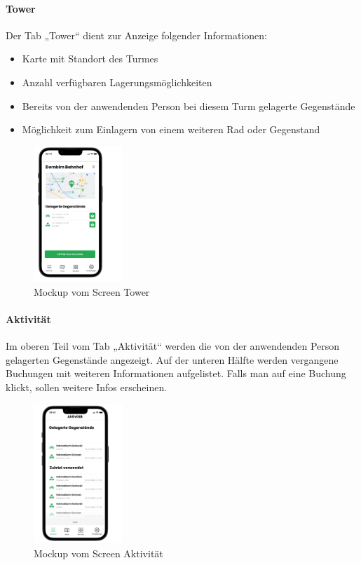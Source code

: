 \paragraph{Tower}Der \Gls{Tab} „Tower“ dient zur Anzeige folgender Informationen:\\
\begin{itemize}
  \item Karte mit Standort des Turmes
  \item Anzahl verfügbaren Lagerungsmöglichkeiten
  \item Bereits von der anwendenden Person bei diesem Turm gelagerte Gegenstände
  \item Möglichkeit zum Einlagern von einem weiteren Rad oder Gegenstand
\end{itemize}
\begin{figure}[H]
  \centering
  \includegraphics[width=0.3\textwidth]{images/app_mock_tower}
  \caption{\Gls{Mockup} vom Screen Tower}
  \label{fig:screentowermock}
\end{figure}

\paragraph{Aktivität}Im oberen Teil vom \Gls{Tab} „Aktivität“ werden die von der anwendenden Person gelagerten Gegenstände angezeigt. Auf der unteren Hälfte werden vergangene Buchungen mit weiteren Informationen aufgelistet. Falls man auf eine Buchung klickt, sollen weitere Infos erscheinen.\\
\begin{figure}[H]
  \centering
  \includegraphics[width=0.3\textwidth]{images/app_mock_objects}
  \caption{\Gls{Mockup} vom Screen Aktivität}
  \label{fig:screenactivitymock}
\end{figure}

